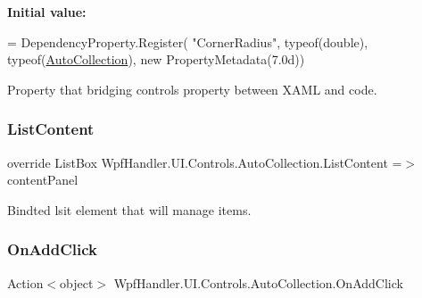 {\bfseries Initial value\+:}
\begin{DoxyCode}
= DependencyProperty.Register(
          \textcolor{stringliteral}{"CornerRadius"}, typeof(\textcolor{keywordtype}{double}), typeof(\mbox{\hyperlink{class_wpf_handler_1_1_u_i_1_1_controls_1_1_auto_collection_a8bc71a7c43dfeca1d6ff113b12088c28}{AutoCollection}}),
          \textcolor{keyword}{new} PropertyMetadata(7.0d))
\end{DoxyCode}


Property that bridging control\textquotesingle{}s property between X\+A\+ML and code. 

\mbox{\label{class_wpf_handler_1_1_u_i_1_1_controls_1_1_auto_collection_a144774a121d36e2207fd0e39dd67a074}} 
\subsubsection{\texorpdfstring{List\+Content}{ListContent}}
{\footnotesize\ttfamily override List\+Box Wpf\+Handler.\+U\+I.\+Controls.\+Auto\+Collection.\+List\+Content =$>$ content\+Panel}



Bindted lsit element that will manage items. 

\mbox{\label{class_wpf_handler_1_1_u_i_1_1_controls_1_1_auto_collection_a996c2d451bb6e072a9ff03ce6a21b5fc}} 
\subsubsection{\texorpdfstring{On\+Add\+Click}{OnAddClick}}
{\footnotesize\ttfamily Action$<$object$>$ Wpf\+Handler.\+U\+I.\+Controls.\+Auto\+Collection.\+On\+Add\+Click}



